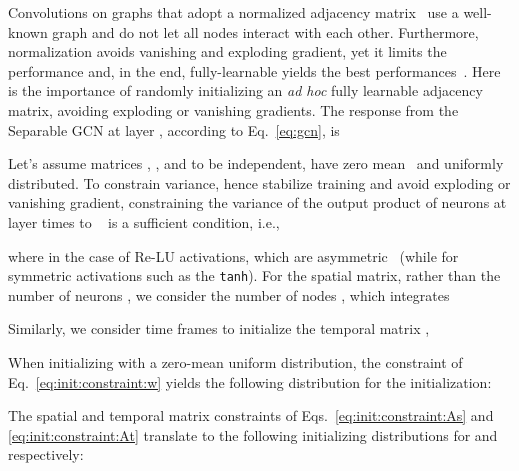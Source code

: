 \documentclass[10pt,twocolumn,letterpaper]{article}
\begin{document}
Convolutions on graphs that adopt a normalized adjacency matrix~\cite{kipf17, tong20} use a well-known graph and do not let all nodes interact with each other.
Furthermore, normalization avoids vanishing and exploding gradient, yet it limits the performance and, in the end, fully-learnable yields the best performances~\cite{sofianos21, sampieri22}.
Here is the importance of randomly initializing an \textit{ad hoc} fully learnable adjacency matrix, avoiding exploding or vanishing gradients.
The response from the Separable GCN at layer , according to Eq.~\eqref{eq:gcn}, is

Let's assume matrices , , and  to be independent, have zero mean~\cite{glorot10, he15} and uniformly distributed.
To constrain variance, hence stabilize training and avoid exploding or vanishing gradient, constraining the variance of the output product of  neurons at layer  times  to ~\cite{he15} is a sufficient condition, i.e.,

where  in the case of Re-LU activations, which are asymmetric~\cite{he15} (while  for symmetric activations such as the \texttt{tanh}).
For the spatial matrix, rather than the number of neurons , we consider the number of nodes , which  integrates

Similarly, we consider  time frames to initialize the temporal matrix ,


When initializing  with a zero-mean uniform distribution, the constraint of Eq.~\eqref{eq:init:constraint:w} yields the following distribution for the initialization:

The spatial and temporal matrix constraints of Eqs.~\eqref{eq:init:constraint:As} and \eqref{eq:init:constraint:At} translate to the following initializing distributions for  and  respectively:
\end{document}
